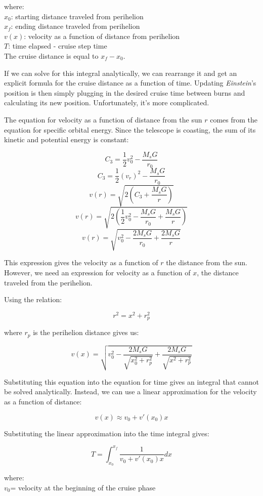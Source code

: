 \documentclass[12pt]{article} %
\begin{document}
where:\\
$x_0$: starting distance traveled from perihelion\\
$x_f$: ending distance traveled from perihelion\\
$v(x)$: velocity as a function of distance from perihelion\\
$T$: time elapsed - cruise step time\\

The cruise distance is equal to $x_f - x_0$.

If we can solve for this integral analytically, we can rearrange it and get an explicit formula for the cruise distance as a function of time. Updating \textit{Einstein}'s position is then simply plugging in the desired cruise time between burns and calculating its new position. Unfortunately, it's more complicated.

The equation for velocity as a function of distance from the sun $r$ comes from the equation for specific orbital energy. Since the telescope is coasting, the sum of its kinetic and potential energy is constant:

$$C_3 = \frac{1}{2}v_0^2-\frac{M_sG}{r_0}$$
$$C_3 = \frac{1}{2}(v_r)^2 - \frac{M_sG}{r_0}$$
$$v(r) = \sqrt{2  (C_3 + \frac{M_sG}{r})}$$
$$v(r) = \sqrt{2  (\frac{1}{2}v_0^2-\frac{M_sG}{r_0} + \frac{M_sG}{r})}$$
$$v(r) = \sqrt{v_0^2-\frac{2M_sG}{r_0} + \frac{2M_sG}{r}}$$

This expression gives the velocity as a function of $r$ the distance from the sun. However, we need an expression for velocity as a function of $x$, the distance traveled from the perihelion. 

Using the relation:

$$r^2 = x^2 + r_p^2$$

where $r_p$ is the perihelion distance gives us:

$$v(x) = \sqrt{v_0^2-\frac{2M_sG}{\sqrt{x_0^2 + r_p^2}} + \frac{2M_sG}{\sqrt{x^2 + r_p^2}}}$$

Substituting this equation into the equation for time gives an integral that cannot be solved analytically. Instead, we can use a linear approximation for the velocity as a function of distance:

$$v(x) \approx v_0 + v'(x_0)x$$

Substituting the linear approximation into the time integral gives:

$$\boxed{T = \int_{x_0}^{x_f} \frac{1}{v_0+v'(x_0)x} dx}$$

where:\\
$v_0$= velocity at the beginning of the cruise phase
\end{document}
